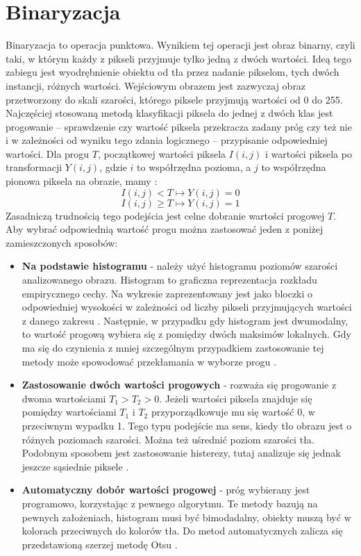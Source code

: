\documentclass[eng,oneside]{mgr}
\begin{document}
\section{Binaryzacja}
Binaryzacja to operacja punktowa. Wynikiem tej operacji jest obraz binarny, czyli taki, w którym każdy z pikseli przyjmuje tylko jedną z dwóch wartości. Ideą tego zabiegu jest wyodrębnienie obiektu od tła przez nadanie pikselom, tych dwóch instancji, różnych wartości. Wejściowym obrazem jest zazwyczaj obraz przetworzony do skali szarości, którego piksele przyjmują wartości od 0 do 255. Najczęściej stosowaną metodą klasyfikacji piksela do jednej z dwóch klas jest progowanie – sprawdzenie czy wartość piksela przekracza zadany próg czy też nie i w zależności od wyniku tego zdania logicznego – przypisanie odpowiedniej wartości. Dla progu $T$, początkowej wartości piksela $I(i,j)$ i wartości piksela po transformacji $Y(i,j)$, gdzie $i$ to współrzędna pozioma, a $j$ to współrzędna pionowa piksela na obrazie, mamy \cite{prog}:
\begin{equation}
I(i,j) < T \longmapsto Y(i,j) = 0 
\end{equation}
\begin{equation}
I(i,j) \geq T \longmapsto Y(i,j) = 1 
\end{equation}
Zasadniczą trudnością tego podejścia jest celne dobranie wartości progowej $T$. Aby wybrać odpowiednią wartość progu można zastosować jeden z poniżej zamieszczonych sposobów:
\begin{itemize}
\item \textbf{Na podstawie histogramu} - należy użyć histogramu poziomów szarości analizowanego obrazu. Histogram to graficzna reprezentacja rozkładu empirycznego cechy. Na wykresie zaprezentowany jest jako bloczki o odpowiedniej wysokości w zależności od liczby pikseli przyjmujących wartości z danego zakresu \cite{histogram1}. Następnie, w przypadku gdy histogram jest dwumodalny, to wartość progową wybiera się z pomiędzy dwóch maksimów lokalnych. Gdy ma się do czynienia z mniej szczególnym przypadkiem zastosowanie tej metody może spowodować przekłamania w wyborze progu \cite{histogram}.
\item \textbf{Zastosowanie dwóch wartości progowych} - rozważa się progowanie z dwoma wartościami $T_1 > T_2 > 0$. Jeżeli wartości piksela znajduje się pomiędzy wartościami $T_1$ i $T_2$ przyporządkowuje mu się wartość 0, w przeciwnym wypadku 1. Tego typu podejście ma sens, kiedy tło obrazu jest o różnych poziomach szarości. Można też uśrednić poziom szarości tła. Podobnym sposobem jest zastosowanie histerezy, tutaj analizuje się jednak jeszcze sąsiednie piksele \cite{dwaprogi}. 
\item \textbf{Automatyczny dobór wartości progowej} - próg wybierany jest programowo, korzystając z pewnego algorytmu. Te metody bazują na pewnych założeniach, histogram musi być bimodadalny, obiekty muszą być w kolorach przeciwnych do kolorów tła. Do metod automatycznych zalicza się przedstawioną szerzej metodę Otsu \cite{auto}.
\end{itemize}
\end{document}
